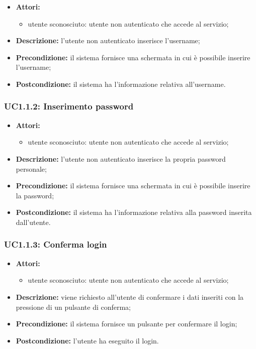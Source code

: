 \begin{itemize}
    \item \textbf{Attori:}
    \begin{itemize}
        \item utente sconosciuto: utente non autenticato che accede al servizio;
    \end{itemize}
    \item \textbf{Descrizione:} l'utente non autenticato inserisce l'username;
    \item \textbf{Precondizione:} il sistema fornisce una schermata in cui è possibile inserire l’username;
    \item \textbf{Postcondizione:} il sistema ha l'informazione relativa all'username.
\end{itemize}

\subsubsection{UC1.1.2: Inserimento password}

\begin{itemize}
    \item \textbf{Attori:}
    \begin{itemize}
        \item utente sconosciuto: utente non autenticato che accede al servizio;
    \end{itemize}
    \item \textbf{Descrizione:} l'utente non autenticato inserisce la propria password personale;
    \item \textbf{Precondizione:} il sistema fornisce una schermata in cui è possibile inserire la password;
    \item \textbf{Postcondizione:} il sistema ha l'informazione relativa alla password inserita dall'utente.
\end{itemize}

\subsubsection{UC1.1.3: Conferma login}

\begin{itemize}
    \item \textbf{Attori:}
    \begin{itemize}
        \item utente sconosciuto: utente non autenticato che accede al servizio;
    \end{itemize}
    \item \textbf{Descrizione:} viene richiesto all'utente di confermare i dati inseriti con la pressione di un pulsante di conferma;
    \item \textbf{Precondizione:} il sistema fornisce un pulsante per confermare il login;
    \item \textbf{Postcondizione:} l'utente ha eseguito il login.
\end{itemize}

